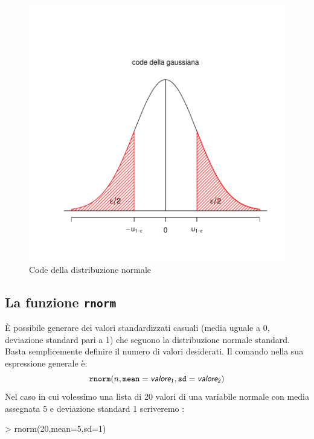 \documentclass[onecolumn,12pt]{book}
\newcommand{\varia}[1]{\textsl{\textsf{#1}}}
\begin{document}
\begin{figure}[htbp]
\begin{center}
\includegraphics{RbookParte2-158}
\caption{Code della distribuzione normale}
\label{fig:normaletratto}
\end{center}
\end{figure}

 \subsection{La funzione \texttt{rnorm}}
\`E possibile generare dei valori standardizzati casuali (media uguale a 0, deviazione standard pari a 1) che seguono la distribuzione normale standard. Basta semplicemente definire il numero di valori desiderati.
Il comando nella sua espressione generale \`e:
\begin{equation}\texttt{rnorm}(n,\texttt{mean}=\varia{valore}_1,\texttt{sd}=\varia{valore}_2)\end{equation}
Nel caso in cui volessimo una lista di 20 valori di una variabile normale con media assegnata 5 e deviazione standard 1 scriveremo :

\begin{Schunk}
\begin{Sinput}
> rnorm(20,mean=5,sd=1)
\end{Sinput}
\end{Schunk}
\end{document}
